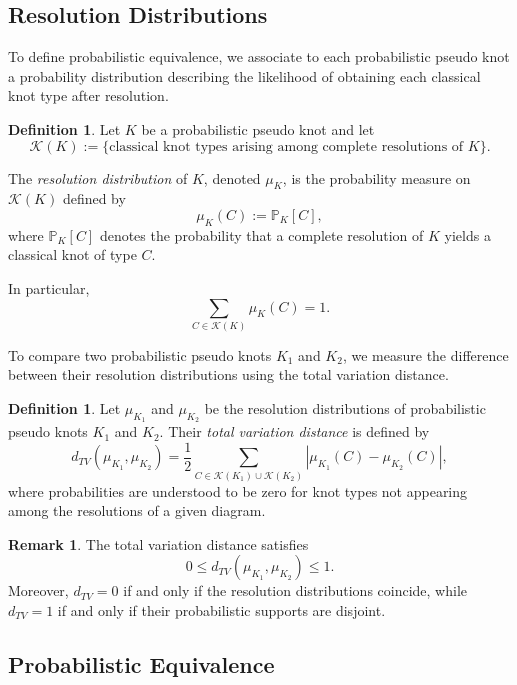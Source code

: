 \documentclass[a4paper, reqno, 12pt]{amsart}
\theoremstyle{plain}
\theoremstyle{definition}
\newtheorem{definition}[theorem]{Definition}
\newtheorem{remark}[theorem]{Remark}
\begin{document}
\subsection{Resolution Distributions}

To define probabilistic equivalence, we associate to each probabilistic pseudo knot a probability distribution describing the likelihood of obtaining each classical knot type after resolution.

\begin{definition}\rm
Let $K$ be a probabilistic pseudo knot and let
\[
\mathcal K(K)
:=
\{\text{classical knot types arising among complete resolutions of }K\}.
\]

The {\it resolution distribution} of $K$, denoted $\mu_K$, is the probability measure on $\mathcal K(K)$ defined by
\[
\mu_K(C)
:=
\mathbb P_K[C],
\]
where $\mathbb P_K[C]$ denotes the probability that a complete resolution of $K$ yields a classical knot of type $C$.

In particular,
\[
\sum_{C\in \mathcal K(K)} \mu_K(C)=1.
\]
\end{definition}



To compare two probabilistic pseudo knots $K_1$ and $K_2$, we measure the difference between their resolution distributions using the total variation distance.

\begin{definition}\rm \label{tvd}
Let $\mu_{K_1}$ and $\mu_{K_2}$ be the resolution distributions of probabilistic pseudo knots $K_1$ and $K_2$. Their {\it total variation distance} is defined by
\[
d_{TV}(\mu_{K_1},\mu_{K_2})
=
\frac12
\sum_{C\in \mathcal K(K_1)\cup \mathcal K(K_2)}
\left|
\mu_{K_1}(C)-\mu_{K_2}(C)
\right|,
\]
where probabilities are understood to be zero for knot types not appearing among the resolutions of a given diagram.
\end{definition}

\begin{remark}\rm
The total variation distance satisfies
\[
0\le d_{TV}(\mu_{K_1},\mu_{K_2})\le 1.
\]
Moreover, $d_{TV}=0$ if and only if the resolution distributions coincide, while $d_{TV}=1$ if and only if their probabilistic supports are disjoint.
\end{remark}



\subsection{Probabilistic Equivalence}
\end{document}
